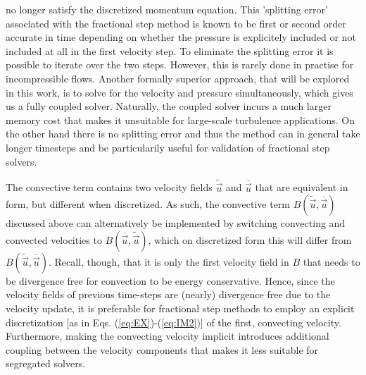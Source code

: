 no longer satisfy the discretized momentum equation. This 'splitting
error' associated with the fractional step method is known to be first
or second order accurate in time depending on whether the pressure is
explicitely included or not included at all in the first velocity
step. To eliminate the splitting error it is possible to iterate over
the two steps. However, this is rarely done in practise for
incompressible flows. Another formally superior approach, that will be
explored in this work, is to solve for the velocity and pressure
simultaneously, which gives us a fully coupled solver. Naturally, the
coupled solver incurs a much larger memory cost that makes it
unsuitable for large-scale turbulence applications. On the other hand
there is no splitting error and thus the method can in general take
longer timesteps and be particularily useful for validation of
fractional step solvers.

The convective term contains two velocity fields $\tilde{\vec{u}}$ and
$\overline{\vec{u}}$ that are equivalent in form, but different when
discretized. As such, the convective term
$B(\tilde{\vec{u}},\overline{\vec{u}})$ discussed above can
alternatively be implemented by switching convecting and convected
velocities to $B(\overline{\vec{u}},\tilde{\vec{u}})$, which on
discretized form this will differ from
$B(\tilde{\vec{u}},\overline{\vec{u}})$. Recall, though, that it is
only the first velocity field in $B$ that needs to be divergence free
for convection to be energy conservative. Hence, since the velocity
fields of previous time-steps are (nearly) divergence free due to the
velocity update, it is preferable for fractional step methods to
employ an explicit discretization [as in
Eqs. (\ref{eq:EX})-(\ref{eq:IM2})] of the first, convecting
velocity. Furthermore, making the convecting velocity implicit
introduces additional coupling between the velocity components that
makes it less suitable for segregated solvers.

